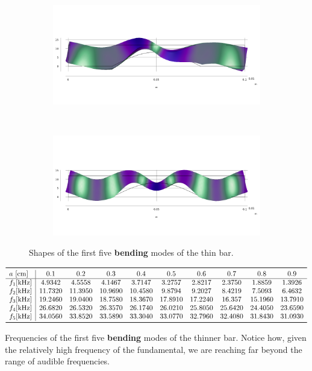 \documentclass[a4paper]{article}
\begin{document}
\begin{figure}[h]
	\begin{subfigure}{0.3\linewidth}
		\centering
		\includegraphics[width=0.95\linewidth]{04c.png}
	\end{subfigure}
	~
	\begin{subfigure}{0.3\linewidth}
		\centering
		\includegraphics[width=0.95\linewidth]{05c.png}
	\end{subfigure}
	
	\caption{Shapes of the first five \textbf{bending} modes of the thin bar.}
	\label{fig:bendThin}
\end{figure}

\begin{table}[h]
	\centering
	$\begin{array}{l|ccccccccc}
		\toprule
		a~[\si{\centi\meter}] & 0.1 & 0.2 & 0.3 & 0.4 & 0.5 & 0.6 & 0.7 & 0.8 & 0.9\\
		\hline
		f_1[\si{\kilo\hertz}]&4.9342   & 4.5558  &  4.1467  &  3.7147   & 3.2757  &  2.8217 &   2.3750 &   1.8859 &   1.3926\\
		f_2[\si{\kilo\hertz}]&11.7320  & 11.3950  & 10.9690 &  10.4580 &   9.8794  &  9.2027  &  8.4219  &  7.5093  &  6.4632\\
		f_3[\si{\kilo\hertz}]&19.2460  & 19.0400  & 18.7580 &  18.3670 &  17.8910  & 17.2240 &   16.357 &  15.1960 &  13.7910\\
		f_4[\si{\kilo\hertz}]&26.6820  & 26.5320  & 26.3570 &  26.1740  & 26.0210 &  25.8050 &  25.6420  & 24.4050 &  23.6590\\
		f_5[\si{\kilo\hertz}]&34.0560 &  33.8520  & 33.5890  & 33.3040  & 33.0770  & 32.7960  & 32.4080 &  31.8430  & 31.0930\\
		\bottomrule
	\end{array}$
	\caption{Frequencies of the first five \textbf{bending} modes of the thinner bar. Notice how, given the relatively high frequency of the fundamental, we are reaching far beyond the range of audible frequencies.}
	\label{tab:thin}
\end{table}
\end{document}
